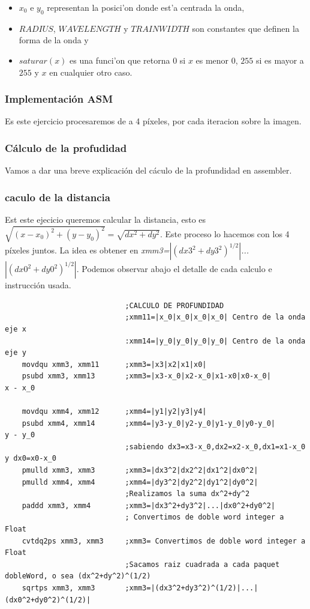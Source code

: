 \begin{itemize}
  \item $x_0$ e $y_0$ representan la posici'on donde est'a centrada la onda,
  \item $RADIUS$, $WAVELENGTH$ y $TRAINWIDTH$ son constantes que definen la 
  forma de la onda y
  \item $saturar(x)$ es una funci'on que retorna $0$ si $x$ es menor $0$, $255$
  si es mayor a $255$ y $x$ en cualquier otro caso.
\end{itemize}

\subsubsection{Implementación ASM}
Es este ejercicio procesaremos de a 4 píxeles, por cada iteracion sobre la imagen.
\subsubsection*{Cálculo de la profudidad}
Vamos a dar una breve explicación del cáculo de la profundidad en assembler.

\subsubsection*{caculo de la distancia}

Est este ejecicio queremos calcular la distancia, esto es $\sqrt{(x-x_0)^2+(y-y_0)^2} = \sqrt{dx^2+dy^2}$.
Este proceso lo hacemos con los 4 píxeles juntos.
La idea es obtener en \emph{xmm3=$|(dx3^2+dy3^2)^{1/2}|$...$|(dx0^2+dy0^2)^{1/2}|$}. Podemos observar abajo el detalle de cada calculo e instrucción usada.
\begin{codesnippet}
\begin{verbatim}
                            ;CALCULO DE PROFUNDIDAD
                            ;xmm11=|x_0|x_0|x_0|x_0| Centro de la onda eje x
                            :xmm14=|y_0|y_0|y_0|y_0| Centro de la onda eje y
    movdqu xmm3, xmm11      ;xmm3=|x3|x2|x1|x0| 
    psubd xmm3, xmm13       ;xmm3=|x3-x_0|x2-x_0|x1-x0|x0-x_0|                    x - x_0
							
    movdqu xmm4, xmm12      ;xmm4=|y1|y2|y3|y4|
    psubd xmm4, xmm14       ;xmm4=|y3-y_0|y2-y_0|y1-y_0|y0-y_0|                     y - y_0	
                            ;sabiendo dx3=x3-x_0,dx2=x2-x_0,dx1=x1-x_0 y dx0=x0-x_0
    pmulld xmm3, xmm3       ;xmm3=|dx3^2|dx2^2|dx1^2|dx0^2|
    pmulld xmm4, xmm4       ;xmm4=|dy3^2|dy2^2|dy1^2|dy0^2|
                            ;Realizamos la suma dx^2+dy^2
    paddd xmm3, xmm4        ;xmm3=|dx3^2+dy3^2|...|dx0^2+dy0^2|
                            ; Convertimos de doble word integer a Float
    cvtdq2ps xmm3, xmm3     ;xmm3= Convertimos de doble word integer a Float
                            ;Sacamos raiz cuadrada a cada paquet dobleWord, o sea (dx^2+dy^2)^(1/2)
    sqrtps xmm3, xmm3       ;xmm3=|(dx3^2+dy3^2)^(1/2)|...|(dx0^2+dy0^2)^(1/2)|
\end{verbatim}
\end{codesnippet}


